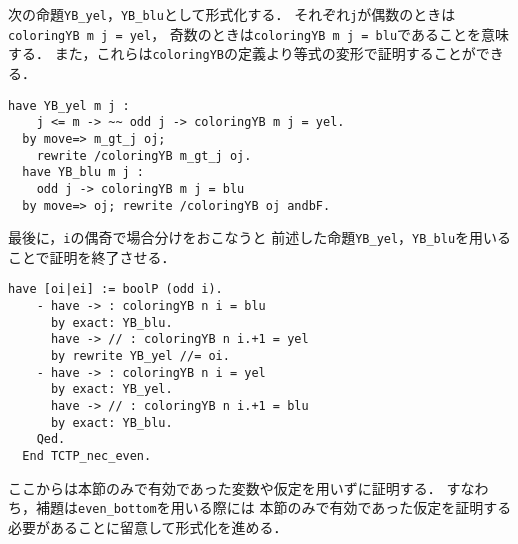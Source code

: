 次の命題{\tt{YB\_yel}}，{\tt{YB\_blu}}として形式化する．
それぞれ{\tt{j}}が偶数のときは{\tt{coloringYB m j = yel}}，
奇数のときは{\tt{coloringYB m j = blu}}であることを意味する．
また，これらは{\tt{coloringYB}}の定義より等式の変形で証明することができる．
\begin{lstlisting}[language=Coq]
  have YB_yel m j :
    j <= m -> ~~ odd j -> coloringYB m j = yel.
  by move=> m_gt_j oj;
    rewrite /coloringYB m_gt_j oj.
  have YB_blu m j :
    odd j -> coloringYB m j = blu
  by move=> oj; rewrite /coloringYB oj andbF.
\end{lstlisting}
最後に，{\tt{i}}の偶奇で場合分けをおこなうと
前述した命題{\tt{YB\_yel}}，{\tt{YB\_blu}}を用いることで証明を終了させる．
\begin{lstlisting}[language=Coq]
    have [oi|ei] := boolP (odd i).
    - have -> : coloringYB n i = blu
      by exact: YB_blu.
      have -> // : coloringYB n i.+1 = yel
      by rewrite YB_yel //= oi.
    - have -> : coloringYB n i = yel
      by exact: YB_yel.
      have -> // : coloringYB n i.+1 = blu
      by exact: YB_blu.
    Qed.
  End TCTP_nec_even.
\end{lstlisting}

ここからは本節のみで有効であった変数や仮定を用いずに証明する．
すなわち，補題は{\tt{even\_bottom}}を用いる際には
本節のみで有効であった仮定を証明する必要があることに留意して形式化を進める．

